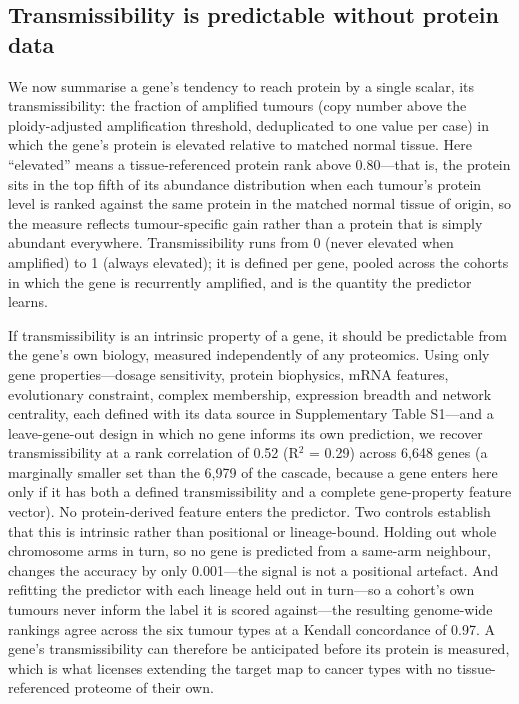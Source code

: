 \documentclass[times, twoside]{zHenriquesLab-StyleBioRxiv}
\begin{document}
\subsection*{Transmissibility is predictable without protein data}
We now summarise a gene's tendency to reach protein by a single scalar, its transmissibility: the fraction of amplified tumours (copy number above the ploidy-adjusted amplification threshold, deduplicated to one value per case) in which the gene's protein is elevated relative to matched normal tissue. Here ``elevated'' means a tissue-referenced protein rank above 0.80---that is, the protein sits in the top fifth of its abundance distribution when each tumour's protein level is ranked against the same protein in the matched normal tissue of origin, so the measure reflects tumour-specific gain rather than a protein that is simply abundant everywhere. Transmissibility runs from 0 (never elevated when amplified) to 1 (always elevated); it is defined per gene, pooled across the cohorts in which the gene is recurrently amplified, and is the quantity the predictor learns.

If transmissibility is an intrinsic property of a gene, it should be predictable from the gene's own biology, measured independently of any proteomics. Using only gene properties---dosage sensitivity, protein biophysics, mRNA features, evolutionary constraint, complex membership, expression breadth and network centrality, each defined with its data source in Supplementary Table S1\cite{ref16,ref17,ref18}---and a leave-gene-out design in which no gene informs its own prediction, we recover transmissibility at a rank correlation of 0.52 (R$^2$ = 0.29) across 6,648 genes (a marginally smaller set than the 6,979 of the cascade, because a gene enters here only if it has both a defined transmissibility and a complete gene-property feature vector). No protein-derived feature enters the predictor. Two controls establish that this is intrinsic rather than positional or lineage-bound. Holding out whole chromosome arms in turn, so no gene is predicted from a same-arm neighbour, changes the accuracy by only 0.001---the signal is not a positional artefact. And refitting the predictor with each lineage held out in turn---so a cohort's own tumours never inform the label it is scored against---the resulting genome-wide rankings agree across the six tumour types at a Kendall concordance of 0.97. A gene's transmissibility can therefore be anticipated before its protein is measured, which is what licenses extending the target map to cancer types with no tissue-referenced proteome of their own.
\end{document}
